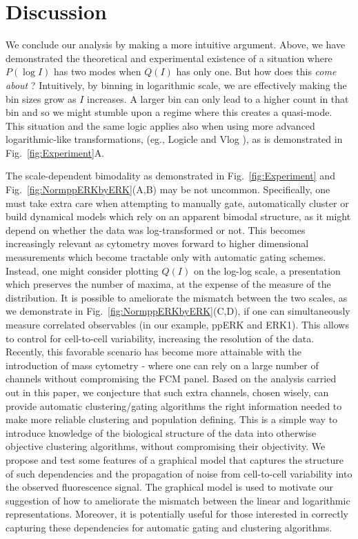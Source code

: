 \documentclass[11pt,a4paper,draft]{article}
\begin{document}
\section*{Discussion}
We conclude our analysis by making a more intuitive argument. Above, we have demonstrated the theoretical and experimental existence of a situation where $P(\log I)$ has two modes when $Q(I)$ has only one. But how does this \emph{come about} ? Intuitively, by binning in logarithmic scale, we are effectively making the bin sizes grow as $I$ increases. A larger bin can only lead to a higher count in that bin and so we might stumble upon a regime where this creates a quasi-mode. This situation and the same logic applies also when using more advanced logarithmic-like transformations, (eg., Logicle \cite{Parks2006} and Vlog \cite{Bagwell2016} ), as is demonstrated in Fig.~\ref{fig:Experiment}A. 
 

\smallskip
The scale-dependent bimodality as demonstrated in Fig.~\ref{fig:Experiment} and Fig.~\ref{fig:NormppERKbyERK}(A,B) may be not uncommon. Specifically, one must take extra care when attempting to manually gate, automatically cluster or build dynamical models which rely on an apparent bimodal structure, as it might depend on whether the data was log-transformed or not. This becomes increasingly relevant as cytometry moves forward to higher dimensional measurements which become tractable only with automatic gating schemes. Instead, one might consider plotting $Q(I)$ on the log-log scale, a presentation which preserves the number of maxima, at the expense of the measure of the distribution. It is possible to ameliorate the mismatch between the two scales, as we demonstrate in Fig.~\ref{fig:NormppERKbyERK}(C,D), if one can simultaneously measure correlated observables (in our example, ppERK and ERK1). This allows to control for cell-to-cell variability, increasing the resolution of the data. Recently, this favorable scenario has become more attainable with the introduction of mass cytometry - where one can rely on a large number of channels without compromising the FCM panel. Based on the analysis carried out in this paper, we conjecture that such extra channels, chosen wisely, can provide automatic clustering/gating algorithms the right information needed to make more reliable clustering and population defining. This is a simple way to introduce knowledge of the biological structure of the data into otherwise objective clustering algorithms, without compromising their objectivity. We propose and test some features of a graphical model that captures the structure of such dependencies and the propagation of noise from cell-to-cell variability into the observed fluorescence signal. The graphical model is used to motivate our suggestion of how to ameliorate the mismatch between the linear and logarithmic representations. Moreover, it is potentially useful for those interested in correctly capturing these dependencies for automatic gating and clustering algorithms. 
\end{document}
